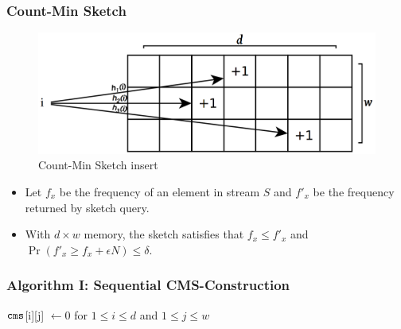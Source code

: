 \documentclass{beamer}
\begin{document}
\begin{frame}
\frametitle{Count-Min Sketch}  
    \begin{figure}[h]
                 \centering
            \includegraphics[scale=0.1]{cm_insert_illustration.png}
            \caption{Count-Min Sketch insert}
            \label{fig:b}
        \end{figure}
 \begin{itemize}
    \item Let $f_x$ be the frequency of an element in stream $S$ and $f'_x$ be the frequency returned by sketch query. \\
    \item With $d \times w$ memory, the sketch satisfies that $f_x \leq f'_x$ and $\Pr\left(f'_x \geq f_x + \epsilon N\right) \leq \delta.$
 \end{itemize}
\end{frame}

\begin{frame}
\frametitle{Algorithm I: Sequential CMS-Construction}
\begin{algorithm}[H]
	
	${\tt cms}$[i][j] $ \leftarrow 0$ for $1 \leq i \leq d$ and $1 \leq j \leq w$
	
	\label{alg:cms_construct}
\end{algorithm}
\end{frame}
\end{document}
